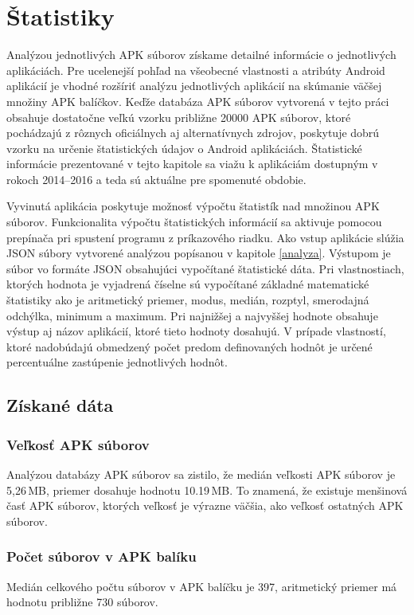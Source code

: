 \chapter{Štatistiky}
\label{statistiky}
Analýzou jednotlivých APK súborov získame detailné informácie o jednotlivých aplikáciách. Pre ucelenejší pohľad na všeobecné vlastnosti a atribúty Android aplikácií je vhodné rozšíriť analýzu jednotlivých aplikácií na skúmanie väčšej množiny APK balíčkov. Keďže databáza APK súborov vytvorená v tejto práci obsahuje dostatočne veľkú vzorku približne 20000 APK súborov, ktoré pochádzajú z rôznych oficiálnych aj alternatívnych zdrojov, poskytuje dobrú vzorku na určenie štatistických údajov o Android aplikáciách. Štatistické informácie prezentované v tejto kapitole sa viažu k aplikáciám dostupným v rokoch 2014--2016 a teda sú aktuálne pre spomenuté obdobie.

Vyvinutá aplikácia  poskytuje možnosť výpočtu štatistík nad množinou APK súborov. Funkcionalita výpočtu štatistických informácií sa aktivuje pomocou prepínača  pri spustení programu z príkazového riadku. Ako vstup aplikácie slúžia JSON súbory vytvorené analýzou popísanou v kapitole \ref{analyza}. Výstupom je súbor vo formáte JSON obsahujúci vypočítané štatistické dáta. Pri vlastnostiach, ktorých hodnota je vyjadrená číselne sú vypočítané základné matematické štatistiky ako je aritmetický priemer, modus, medián, rozptyl, smerodajná odchýlka, minimum a maximum. Pri najnižšej a najvyššej hodnote obsahuje výstup aj názov aplikácií, ktoré tieto hodnoty dosahujú. V prípade vlastností, ktoré nadobúdajú obmedzený počet predom definovaných hodnôt je určené percentuálne zastúpenie jednotlivých hodnôt.

\section{Získané dáta}
\subsection*{Veľkosť APK súborov}
Analýzou databázy APK súborov sa zistilo, že medián veľkosti APK súborov je 5,26\,MB, priemer dosahuje hodnotu 10.19\,MB. To znamená, že existuje menšinová časť APK súborov, ktorých veľkosť je výrazne väčšia, ako veľkosť ostatných APK súborov.

\subsection*{Počet súborov v APK balíku}
Medián celkového počtu súborov v APK balíčku je 397, aritmetický priemer má hodnotu približne 730 súborov. 

